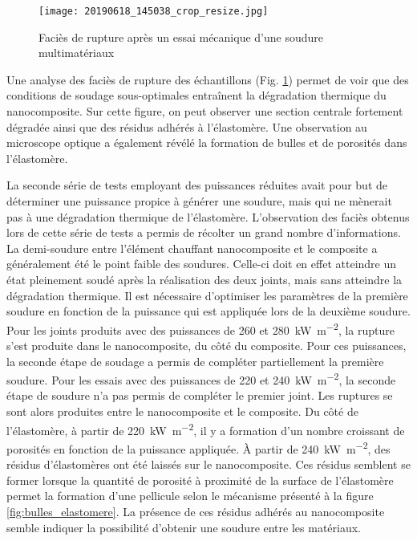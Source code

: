 \begin{figure}[h]
	\centering
	\texttt{[image: 20190618\_145038\_crop\_resize.jpg]}
	\caption{Faciès de rupture après un essai mécanique d'une soudure multimatériaux}
	\label{fig:facies_multi_materiau}
\end{figure}

Une analyse des faciès de rupture des échantillons (Fig. \ref{fig:facies_multi_materiau}) permet de voir que des conditions de soudage sous-optimales entraînent la dégradation thermique du nanocomposite. 
Sur cette figure, on peut observer une section centrale fortement dégradée ainsi que des résidus adhérés à l'élastomère. 
Une observation au microscope optique a également révélé la formation de bulles et de porosités dans l'élastomère. 

La seconde série de tests employant des puissances réduites avait pour but de déterminer une puissance propice à générer une soudure, mais qui ne mènerait pas à une dégradation thermique de l'élastomère. 
L'observation des faciès obtenus lors de cette série de tests a permis de récolter un grand nombre d'informations. 
La demi-soudure entre l'élément chauffant nanocomposite et le composite a généralement été le point faible des soudures. 
Celle-ci doit en effet atteindre un état pleinement soudé après la réalisation des deux joints, mais sans atteindre la dégradation thermique. 
Il est nécessaire d'optimiser les paramètres de la première soudure en fonction de la puissance qui est appliquée lors de la deuxième soudure. 
Pour les joints produits avec des puissances de 260 et \SI[locale=FR]{280}{\kilo\watt\per\square\metre}, la rupture s'est produite dans le nanocomposite, du côté du composite. 
Pour ces puissances, la seconde étape de soudage a permis de compléter partiellement la première soudure. 
Pour les essais avec des puissances de 220 et \SI[locale=FR]{240}{\kilo\watt\per\square\metre}, la seconde étape de soudure n'a pas permis de compléter le premier joint.
Les ruptures se sont alors produites entre le nanocomposite et le composite. 
Du côté de l'élastomère, à partir de \SI[locale=FR]{220}{\kilo\watt\per\square\metre}, il y a formation d'un nombre croissant de porosités en fonction de la puissance appliquée. 
À partir de \SI[locale=FR]{240}{\kilo\watt\per\square\metre}, des résidus d'élastomères ont été laissés sur le nanocomposite. 
Ces résidus semblent se former lorsque la quantité de porosité à proximité de la surface de l'élastomère permet la formation d'une pellicule selon le mécanisme présenté à la figure \ref{fig:bulles_elastomere}. 
La présence de ces résidus adhérés au nanocomposite semble indiquer la possibilité d'obtenir une soudure entre les matériaux. 

